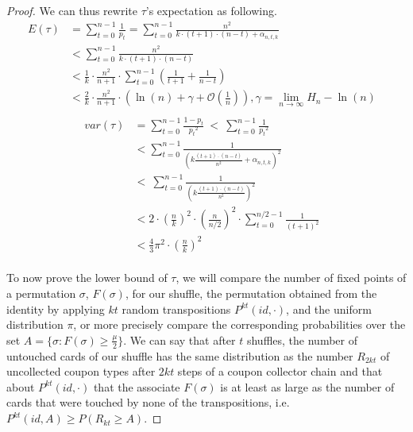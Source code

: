 \documentclass[USenglish,oneside,twocolumn]{article}
\begin{document}
\begin{proof}
We can thus rewrite $\tau$'s expectation as following.
\begin{align*}
 E(\tau) &= \sum_{t=0}^{n-1} \frac{1}{p_{t}} = \sum_{t=0}^{n-1} \frac{n^2}{k \cdot (t+1)\cdot(n-t) + \alpha_{n,t,k}}&\\
 &< \sum_{t=0}^{n-1} \frac{n^2}{k \cdot (t+1)\cdot(n-t)}  &\\
 &< \frac{1}{k} \cdot \frac{n^2}{n+1} \cdot  \sum_{t=0}^{n-1} \left ( \frac{1}{t+1} + \frac{1}{n-t} \right ) &\\
 &< \frac{2}{k} \cdot \frac{n^2}{n+1} \cdot \left( \ln(n) + \gamma +\mathcal{O}(\frac{1}{n}) \right), \gamma = \lim_{n \to \infty} H_n - \ln(n)& \\
 \end{align*}
 \begin{align*}
 var(\tau) &= \sum_{t=0}^{n-1}\frac{1-p_t}{{p_t}^2}\ <\  \sum_{t=0}^{n-1}\frac{1}{{p_t}^2} &\\
 &< \sum_{t=0}^{n-1}\frac{1}{\left ( k \frac{(t+1)\cdot(n-t)}{n^2} + \alpha_{n,t,k}\right )^2}\\\
 &<\ \sum_{t=0}^{n-1} \frac{1 }{\left ( k \frac{(t+1)\cdot(n-t)}{n^2} \right )^2} &\\
 &< 2 \cdot \left (\frac{n}{k} \right )^2 \cdot \left (\frac{n}{n/2} \right )^2 \cdot \sum_{t=0}^{n/2-1} \frac{1}{(t+1)^2} &\\
 &< \frac{4}{3} \pi^2 \cdot \left (\frac{n}{k} \right )^2 
\end{align*}
\\

To now prove the lower bound of $\tau$, we will compare the number of fixed points of a permutation $\sigma$, $F(\sigma)$, for our shuffle, the permutation
obtained from the identity by applying $kt$ random transpositions $ P^{kt}(id, \cdot)$, and the uniform distribution $\pi$, or more precisely compare the corresponding probabilities over the set $A=\{\sigma : F(\sigma) \geq \frac{\mu}{2} \}$.
We can say that after $t$ shuffles, the number of untouched cards of our shuffle has the same distribution as the number $R_{2kt}$ of uncollected coupon types after $2kt$ steps of a coupon collector chain
and that about $ P^{kt}(id, \cdot)$ that the associate $F(\sigma)$ is at least as large as the number of cards that were touched by none of the transpositions, i.e. $P^{kt}(id,A) \geq P(R_{kt}\geq A) $.


\end{proof}
\end{document}
